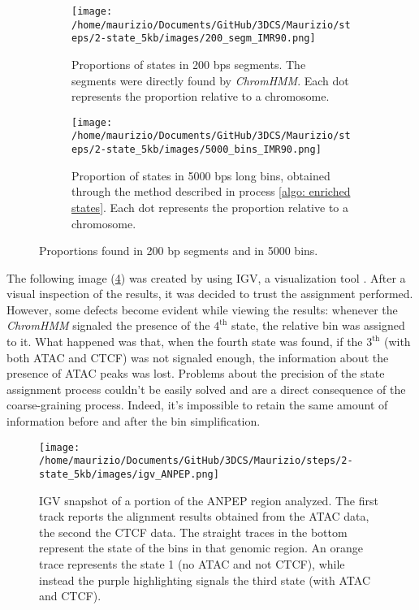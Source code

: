 \begin{figure}[H]
  \centering
  \begin{subfigure}[t]{0.40\textwidth}
    \texttt{[image: /home/maurizio/Documents/GitHub/3DCS/Maurizio/steps/2-state\_5kb/images/200\_segm\_IMR90.png]}
    \caption{Proportions of states in 200 bps segments. The segments were directly found by \textit{ChromHMM}. Each dot represents the proportion relative to a chromosome.}
    \label{fig: proportions in segments}
  \end{subfigure}
  \begin{subfigure}[t]{0.40\textwidth}
      \texttt{[image: /home/maurizio/Documents/GitHub/3DCS/Maurizio/steps/2-state\_5kb/images/5000\_bins\_IMR90.png]}
      \caption{Proportion of states in 5000 bps long bins, obtained through the method described in process \ref{algo: enriched states}. Each dot represents the proportion relative to a chromosome.}
      \label{fig: proportions in bins}
  \end{subfigure}
  \caption{Proportions found in 200 bp segments and in 5000 bins.}
  \label{fig: proportions bins and steps}
\end{figure}


The following image (\ref{fig: ANPEP igv}) was created by using IGV, a visualization tool
\cite{robinsonIgvJsEmbeddable2020, robinsonIntegrativeGenomicsViewer2011c}. 
After a visual inspection of the results, it was decided to trust the assignment performed. However, some defects become evident while viewing the results: whenever the \textit{ChromHMM} signaled the presence of the $4^{\text{th}}$ state, the relative bin was assigned to it. What happened was that, when the fourth state was found, if the $3^{\text{th}}$ (with both ATAC and CTCF) was not signaled enough, the information about the presence of ATAC peaks was lost. Problems about the precision of the state assignment process couldn't be easily solved and are a direct consequence of the coarse-graining process.
Indeed, it's impossible to retain the same amount of information before and after the bin simplification.

\begin{figure}[H]
  \centering
  \texttt{[image: /home/maurizio/Documents/GitHub/3DCS/Maurizio/steps/2-state\_5kb/images/igv\_ANPEP.png]}
  \caption{IGV snapshot of a portion of the ANPEP region analyzed. The first track reports the alignment results obtained from the ATAC data, the second the CTCF data. The straight traces in the bottom represent the state of the bins in that genomic region. An orange trace represents the state 1 (no ATAC and not CTCF), while instead the purple highlighting signals the third state (with ATAC and CTCF).}
  \label{fig: ANPEP igv}
\end{figure}
